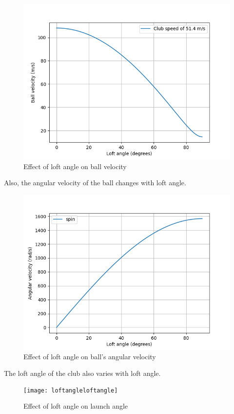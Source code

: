 \documentclass[12pt]{article}
\begin{document}
\begin{figure}[H]
\centering
\caption{Effect of loft angle on ball velocity}
\includegraphics[scale=0.6]{loftangleandballvelocity}
\end{figure}

Also, the angular velocity of the ball changes with loft angle.

\begin{figure}[H]
\centering
\caption{Effect of loft angle on ball's angular velocity}
\includegraphics[scale=0.6]{loftangleandspin}
\end{figure}

The loft angle of the club also varies with loft angle.

\begin{figure}[H]
\centering
\caption{Effect of loft angle on launch angle}
\texttt{[image: loftangleloftangle]}
\end{figure}
\end{document}
